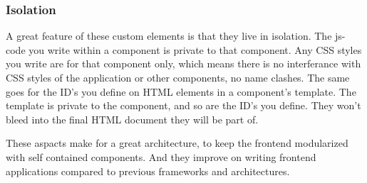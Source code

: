 \subsubsection{Isolation}
A great feature of these custom elements is that they live in isolation.
The \gls{js-code} you write within a component is private to that component.
Any CSS styles you write are for that component only,
which means there is no interferance with CSS styles of the application
or other components, no name clashes.
The same goes for the ID's you define
on HTML elements in a component's template.
The template is private to the component, and so are the ID's you define.
They won't bleed into the final HTML document they will be part of.

These aspacts make for a great architecture,
to keep the frontend modularized with self contained components.
And they improve on writing frontend applications
compared to previous frameworks and architectures.

